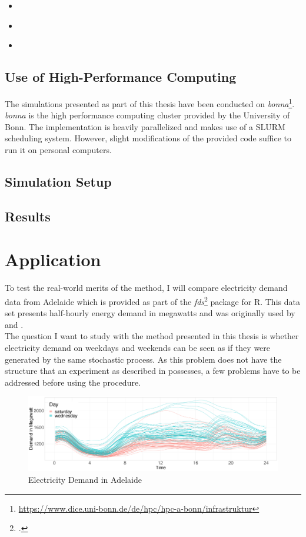 \documentclass[12pt, a4paper]{article}
\theoremstyle{MAstyle} \newtheorem{assumption}{Assumption}[section]
\theoremstyle{MAstyle} \newtheorem{definition}{Definition}[section]
\begin{document}
			\begin{itemize}
				\item \cite{fda}
				\item \cite{tidyverse}
				\item \cite{refund}
			\end{itemize}
			
		\subsection{Use of High-Performance Computing}
			The simulations presented as part of this thesis have been conducted on \textit{bonna}\footnote{\href{https://www.dice.uni-bonn.de/de/hpc/hpc-a-bonn/infrastruktur}{https://www.dice.uni-bonn.de/de/hpc/hpc-a-bonn/infrastruktur}}. \textit{bonna} is the high performance computing cluster provided by the University of Bonn. The implementation is heavily parallelized and makes use of a SLURM scheduling system. However, slight modifications of the provided code suffice to run it on personal computers.

		\subsection{Simulation Setup}
		
		\subsection{Results}
		
	\section{Application}\label{Application}
		To test the real-world merits of the method, I will compare electricity demand data from Adelaide which is provided as part of the \textit{fds}\footcite{fds} package for R. This data set presents half-hourly energy demand in megawatts and was originally used by \cite{magnano_generation_2007} and \cite{magnano_generation_2008}.\\
		The question I want to study with the method presented in this thesis is whether electricity demand on weekdays and weekends can be seen as if they were generated by the same stochastic process. As this problem does not have the structure that an experiment as described in \cite{bugni_permutation_2021} possesses, a few problems have to be addressed before using the procedure.
	
		\begin{figure}[H]
			\includegraphics[width=\textwidth]{../Graphics/electricity_demand_curves.PDF}
			\caption{Electricity Demand in Adelaide}
			\label{electricity_demand}
		\end{figure}
		
\end{document}
